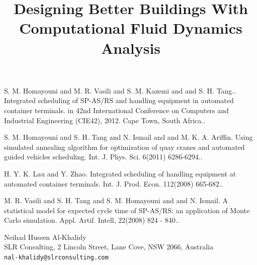 \documentclass[article, A4, 11pt]{llncs}%
\begin{document}

\begin{thebibliography}{10}
{\sc S. M. Homayouni and M. R. Vasili and S. M. Kazemi and and S. H. Tang.}. {Integrated scheduling of SP-AS/RS and handling equipment in automated container terminals}. in 42nd International Conference on Computers and Industrial Engineering (CIE42), 2012. Cape Town, South Africa..

{\sc S. M. Homayouni and S. H. Tang and N. Ismail and and M. K. A. Ariffin}. {Using simulated annealing algorithm for optimization of quay cranes and automated guided vehicles scheduling}. Int. J. Phys. Sci. 6(2011) 6286-6294..

{\sc H. Y. K. Lau and Y. Zhao}. {Integrated scheduling of handling equipment at automated container terminals}. Int. J. Prod. Econ. 112(2008) 665-682..

{\sc M. R. Vasili and S. H. Tang and S. M. Homayouni and and N. Ismail}. {A statistical model for expected cycle time of SP-AS/RS: an application of Monte Carlo simulation}. Appl. Artif. Intell, 22(2008) 824 - 840..
\end{thebibliography} %

\title{Designing Better Buildings With Computational Fluid Dynamics Analysis}
 \author{} \institute{}
\maketitle
\begin{center}
{\large Neihad Hussen Al-Khalidy}\\
SLR Consulting, 2 Lincoln Street, Lane Cove, NSW 2066, Australia\\
{\tt nal-khalidy@slrconsulting.com}
\end{center}
\end{document}
